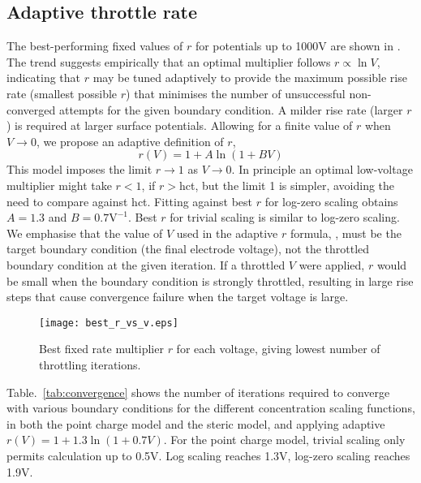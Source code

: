 \subsection{Adaptive throttle rate}

The best-performing fixed values of $r$  for potentials up to 1000V are shown
in  . The trend suggests empirically that an
optimal multiplier follows
$r \propto \ln V$, indicating that $r$ 
may be tuned adaptively to provide the maximum possible rise rate (smallest
possible $r$) that minimises the number of unsuccessful non-converged
attempts for the given boundary condition.  A milder
rise rate (larger $r$) is required at larger surface potentials.
Allowing for a finite value of $r$ when $V \rightarrow 0$, we propose
an adaptive definition of $r$,
\begin{equation}
  r(V) = 1 + A \ln(1 + B V)
  \label{adaptive_r}
\end{equation}
This model imposes the limit $r \rightarrow 1$ as $V \rightarrow 0$.
In principle an optimal low-voltage multiplier might take $r<1$, if
$r>$hct, but the limit 1 is simpler, avoiding the need to 
compare against hct.  Fitting against best $r$ for log-zero scaling
obtains $A=1.3$ and $B=0.7 \textrm{V}^{-1}$. Best $r$ for trivial
scaling is similar to log-zero scaling.
We emphasise that the value of $V$ used in the adaptive $r$ formula, ,
must be the target boundary condition (the final electrode voltage),
not the throttled boundary condition at the given iteration.  If a throttled $V$ were
applied, $r$ would be small when the boundary condition is strongly
throttled, resulting in large rise steps that cause convergence
failure when the  target voltage is large.


\begin{figure}
\centering
\texttt{[image: best\_r\_vs\_v.eps]}
\caption{Best fixed rate multiplier $r$ for each voltage, giving lowest
  number of throttling iterations.
}
\label{fig:best_throttle_rate}
\end{figure}



Table.~\ref{tab:convergence} shows  the number of iterations required
to converge with various boundary conditions for the different
concentration scaling functions, in both the point charge model and the
steric model, and applying adaptive
$r(V)=1+1.3\ln(1+0.7V)$. For the point charge model, trivial scaling only
permits calculation up to 0.5V. Log scaling reaches 1.3V, log-zero
scaling reaches 1.9V.

